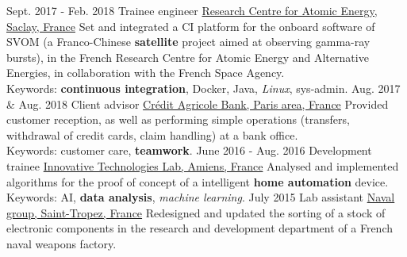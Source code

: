 \documentclass[a4paper]{twentysecondcv} %
\begin{document}
\begin{twenty} %
    \twentyitem
    	{Sept. 2017 -}
		{Feb. 2018}
        {Trainee engineer}
        {\href{http://irfu.cea.fr/}{Research Centre for Atomic Energy, Saclay, France}}
        {}
        {Set and integrated a CI platform for the onboard software of SVOM (a Franco-Chinese \textbf{satellite} project aimed at observing gamma-ray bursts), in the French Research Centre for Atomic Energy and Alternative Energies, in collaboration with the French Space Agency.\\Keywords: \textbf{continuous integration}, Docker, Java, \textit{Linux}, sys-admin.}
    \twentyitem
        {Aug. 2017 \&}
                {Aug. 2018}
        {Client advisor}
        {\href{https://ca-paris.com/}{Crédit Agricole Bank, Paris area, France}}
        {}
        {Provided customer reception, as well as performing simple operations (transfers, withdrawal of credit cards, claim handling) at a bank office.\\Keywords: customer care, \textbf{teamwork}.}
	\twentyitem
    	{June 2016 -}
		{Aug. 2016}
        {Development trainee}
        {\href{http://lti-picardie.fr/}{Innovative Technologies Lab, Amiens, France}}
        {}
        {Analysed and implemented algorithms for the proof of concept of a intelligent \textbf{home automation} device.\\Keywords: AI, \textbf{data analysis}, \textit{machine learning}.}
     \twentyitem
   		{July 2015}
		{}
        {Lab assistant}
        {\href{https://www.naval-group.com/fr/}{Naval group, Saint-Tropez, France}}
        {}
        {Redesigned and updated the sorting of a stock of electronic components in the research and development department of a French naval weapons factory.}
\end{twenty}

\end{document}
